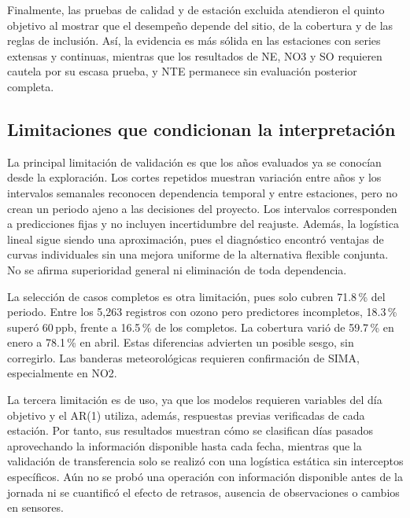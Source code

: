 \documentclass[11pt,letterpaper]{article}
\newcommand{\ppb}{\,ppb}
\newenvironment{cambio}{}{}
\begin{document}
Finalmente, las pruebas de calidad y de estación excluida atendieron el quinto objetivo al mostrar que el desempeño depende del sitio, de la cobertura y de las reglas de inclusión. Así, la evidencia es más sólida en las estaciones con series extensas y continuas, mientras que los resultados de NE, NO3 y SO requieren cautela por su escasa prueba, y NTE permanece sin evaluación posterior completa.

\subsection{Limitaciones que condicionan la interpretación}

\begin{cambio}
La principal limitación de validación es que los años evaluados ya se conocían desde la exploración. Los cortes repetidos muestran variación entre años y los intervalos semanales reconocen dependencia temporal y entre estaciones, pero no crean un periodo ajeno a las decisiones del proyecto. Los intervalos corresponden a predicciones fijas y no incluyen incertidumbre del reajuste. Además, la logística lineal sigue siendo una aproximación, pues el diagnóstico encontró ventajas de curvas individuales sin una mejora uniforme de la alternativa flexible conjunta. No se afirma superioridad general ni eliminación de toda dependencia.
\end{cambio}

\clearpage



\begin{cambio}
La selección de casos completos es otra limitación, pues solo cubren 71.8\,\% del periodo. Entre los 5,263 registros con ozono pero predictores incompletos, 18.3\,\% superó 60\ppb, frente a 16.5\,\% de los completos. La cobertura varió de 59.7\,\% en enero a 78.1\,\% en abril. Estas diferencias advierten un posible sesgo, sin corregirlo. Las banderas meteorológicas requieren confirmación de SIMA, especialmente en NO2.
\end{cambio}


La tercera limitación es de uso, ya que los modelos requieren variables del día objetivo y el AR(1) utiliza, además, respuestas previas verificadas de cada estación. Por tanto, sus resultados muestran cómo se clasifican días pasados aprovechando la información disponible hasta cada fecha, mientras que la validación de transferencia solo se realizó con una logística estática sin interceptos específicos. Aún no se probó una operación con información disponible antes de la jornada ni se cuantificó el efecto de retrasos, ausencia de observaciones o cambios en sensores.
\end{document}
